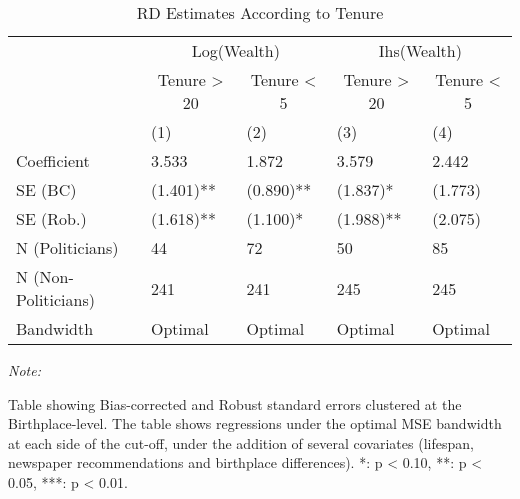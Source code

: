 \begin{table}[!h]

\caption{\label{tab:tenure_results_flexbw}RD Estimates According to Tenure}
\centering
\fontsize{7}{9}\selectfont
\begin{threeparttable}
\begin{tabular}[t]{lllll}
\toprule
\multicolumn{1}{c}{ } & \multicolumn{2}{c}{Log(Wealth)} & \multicolumn{2}{c}{Ihs(Wealth)} \\
\cmidrule(l{3pt}r{3pt}){2-3} \cmidrule(l{3pt}r{3pt}){4-5}
\multicolumn{1}{c}{ } & \multicolumn{1}{c}{Tenure > 20} & \multicolumn{1}{c}{Tenure < 5} & \multicolumn{1}{c}{Tenure > 20} & \multicolumn{1}{c}{Tenure < 5} \\
\cmidrule(l{3pt}r{3pt}){2-2} \cmidrule(l{3pt}r{3pt}){3-3} \cmidrule(l{3pt}r{3pt}){4-4} \cmidrule(l{3pt}r{3pt}){5-5}
  & (1) & (2) & (3) & (4)\\
\midrule
Coefficient & 3.533 & 1.872 & 3.579 & 2.442\\
SE (BC) & (1.401)** & (0.890)** & (1.837)* & (1.773)\\
SE (Rob.) & (1.618)** & (1.100)* & (1.988)** & (2.075)\\
N (Politicians) & 44 & 72 & 50 & 85\\
N (Non-Politicians) & 241 & 241 & 245 & 245\\
Bandwidth & Optimal & Optimal & Optimal & Optimal\\
\bottomrule
\end{tabular}
\begin{tablenotes}[para]
\item \textit{Note: } 
\item Table showing Bias-corrected and Robust standard errors clustered at the Birthplace-level. The table shows regressions under the optimal MSE bandwidth at each side of the cut-off, under the addition of several covariates (lifespan, newspaper recommendations and birthplace differences).  *: p < 0.10, **: p < 0.05, ***: p < 0.01.
\end{tablenotes}
\end{threeparttable}
\end{table}
